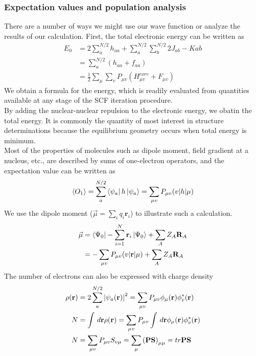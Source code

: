 \documentclass[11pt]{article}
\begin{document}
\subsubsection{Expectation values and population analysis}
There are a number of ways we might use our wave function or analyze the results of our calculation. First, the total electronic energy can be written as
\begin{equation}
    \begin{split}
        E_0&=2\sum_{a}^{N/2}h_{aa}+\sum_{a}^{N/2}\sum_{b}^{N/2}2J_{ab}-K{ab}\\
        &=\sum_{a}^{N/2}(h_{aa}+f_{aa})\\
        &=\frac{1}{2}\sum_{\mu}\sum_{v}P_{\mu v}(H_{\mu v}^{core}+F_{\mu v})
    \end{split}
\end{equation}
We obtain a formula for the energy, which is readily evaluated from quantities available at any stage of the SCF iteration procedure.\\
By adding the nuclear-nuclear repulsion to the electronic energy, we obatin the total energy. It is commonly the quantity of most interest
in structure determinations because the equilibrium geometry occurs when total energy is minimum.\\
Most of the properties of molecules such as dipole moment, field gradient at a nucleus, etc., are described by sums of one-electron operators, and
the expectation value can be written as
\begin{equation}
    \braket{O_1}=\sum_{a}^{N/2}\bra{\psi_a}h\ket{\psi_a}=\sum_{\mu v}P_{\mu v}(v|h|\mu)
\end{equation}
We use the dipole moment ($\vec{\mu}=\sum_{i}q_i\mathbf{r}_i$) to illustrate such a calculation.
\begin{align}
    \vec{\mu}&=\bra{\Psi_0}-\sum_{i=1}^{N}\mathbf{r}_i\ket{\Psi_0}+\sum_{A}Z_A\mathbf{R}_A\notag\\
    &=-\sum_{\mu v}P_{\mu v}(v|\mathbf{r}|\mu)+\sum_{A}Z_A\mathbf{R}_A
\end{align}
The number of electrons can also be expressed with charge density
\begin{align}
    \rho(\mathbf{r})&=2\sum_{a}^{N/2}{\lvert \psi_a(\mathbf{r})\rvert}^2=\sum_{\mu v}P_{\mu v}\phi_\mu(\mathbf{r})\phi_v^*(\mathbf{r})\notag\\
    N&=\int\,d\mathbf{r}\rho(\mathbf{r})=\sum_{\mu v}P_{\mu v}\int\,d\mathbf{r}\phi_\mu(\mathbf{r})\phi_v^*(\mathbf{r})\notag \\
    N&=\sum_{\mu v}P_{\mu v}S_{v \mu}=\sum_{\mu}{(\mathbf{PS})}_{\mu \mu}=tr\mathbf{PS}
\end{align}
\end{document}
